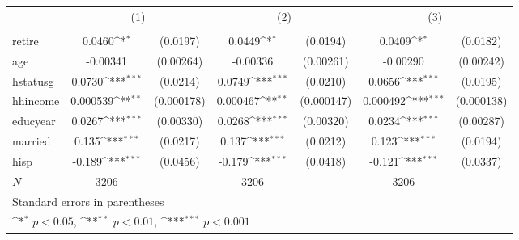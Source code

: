 {
\def\sym#1{\ifmmode^{#1}\else\(^{#1}\)\fi}
\begin{tabular}{l*{3}{cc}}
\hline\hline
            &\multicolumn{2}{c}{(1)}           &\multicolumn{2}{c}{(2)}           &\multicolumn{2}{c}{(3)}           \\
            &\multicolumn{2}{c}{}              &\multicolumn{2}{c}{}              &\multicolumn{2}{c}{}              \\
\hline
retire      &      0.0460\sym{*}  &    (0.0197)&      0.0449\sym{*}  &    (0.0194)&      0.0409\sym{*}  &    (0.0182)\\
age         &    -0.00341         &   (0.00264)&    -0.00336         &   (0.00261)&    -0.00290         &   (0.00242)\\
hstatusg    &      0.0730\sym{***}&    (0.0214)&      0.0749\sym{***}&    (0.0210)&      0.0656\sym{***}&    (0.0195)\\
hhincome    &    0.000539\sym{**} &  (0.000178)&    0.000467\sym{**} &  (0.000147)&    0.000492\sym{***}&  (0.000138)\\
educyear    &      0.0267\sym{***}&   (0.00330)&      0.0268\sym{***}&   (0.00320)&      0.0234\sym{***}&   (0.00287)\\
married     &       0.135\sym{***}&    (0.0217)&       0.137\sym{***}&    (0.0212)&       0.123\sym{***}&    (0.0194)\\
hisp        &      -0.189\sym{***}&    (0.0456)&      -0.179\sym{***}&    (0.0418)&      -0.121\sym{***}&    (0.0337)\\
\hline
\(N\)       &        3206         &            &        3206         &            &        3206         &            \\
\hline\hline
\multicolumn{7}{l}{\footnotesize Standard errors in parentheses}\\
\multicolumn{7}{l}{\footnotesize \sym{*} \(p<0.05\), \sym{**} \(p<0.01\), \sym{***} \(p<0.001\)}\\
\end{tabular}
}
